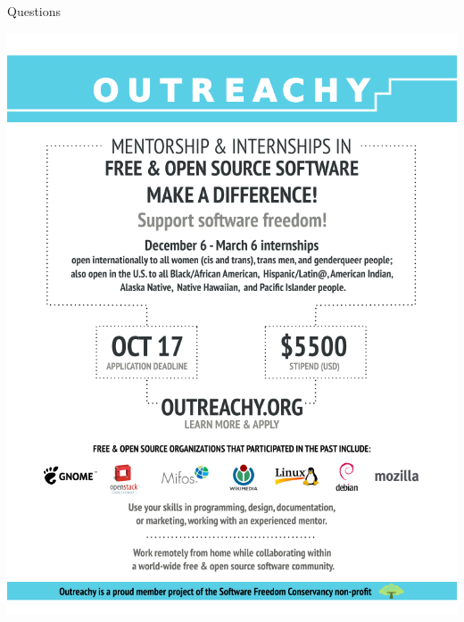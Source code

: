 \documentclass[pdf]{beamer}
\begin{document}
\begin{frame}{Questions}
  \begin{center}
    \includegraphics[scale=0.28]{img/outreachy-applicants-2016-December.png}
  \end{center}
\end{frame}
\end{document}
